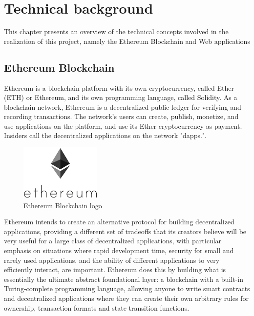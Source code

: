 \chapter{Technical background}
This chapter presents an overview of the technical concepts involved in the realization of this project, namely the Ethereum Blockchain and Web applications
\section{Ethereum Blockchain}
Ethereum is a blockchain platform with its own \gls{cryptocurrency}, called Ether (ETH) or Ethereum, and its own programming language, called Solidity. As a blockchain network, Ethereum is a decentralized public ledger for verifying and recording transactions. The network's users can create, publish, monetize, and use applications on the platform, and use its Ether cryptocurrency as payment. Insiders call the decentralized applications on the network "dapps."\cite{ethereumcommunityEthereumDevelopmentDocumentation}.

\begin{figure}
	\vspace{-10pt}
	\includegraphics[width=4cm]{images/chapter2/ethereum.png}
	\vspace{-10pt}
	\caption{{\footnotesize Ethereum Blockchain logo}}
\end{figure}

Ethereum intends to create an alternative protocol for building decentralized applications, providing a different set of tradeoffs that its creators believe will be very useful for a large class of decentralized applications, with particular emphasis on situations where rapid development time, security for small and rarely used applications, and the ability of different applications to very efficiently interact, are important. Ethereum does this by building what is essentially the ultimate abstract foundational layer: a blockchain with a built-in Turing-complete programming language, allowing anyone to write smart contracts and decentralized applications where they can create their own arbitrary rules for ownership, transaction formats and state transition functions.

